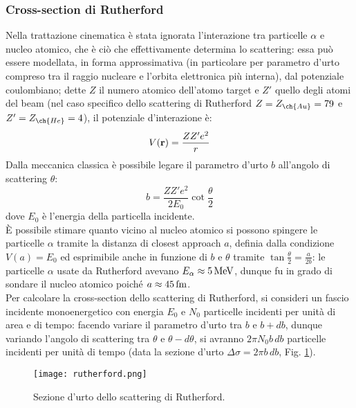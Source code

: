 \subsubsection{Cross-section di Rutherford}

Nella trattazione cinematica è stata ignorata l'interazione tra particelle $ \alpha $ e nucleo atomico, che è ciò che effettivamente determina lo scattering: essa può essere modellata, in forma approssimativa (in particolare per parametro d'urto compreso tra il raggio nucleare e l'orbita elettronica più interna), dal potenziale coulombiano; dette $ Z $ il numero atomico dell'atomo target e $ Z' $ quello degli atomi del beam (nel caso specifico dello scattering di Rutherford $ Z = Z_{\ch{Au}} = 79 $ e $ Z' = Z_{\ch{He}} = 4 $), il potenziale d'interazione è:
\begin{equation}
	V(\mathbf{r}) = \frac{ZZ' e^2}{r}
	\label{eq:4}
\end{equation}
Dalla meccanica classica è possibile legare il parametro d'urto $ b $ all'angolo di scattering $ \theta $:
\begin{equation}
	b = \frac{ZZ' e^2}{2 E_0} \cot \frac{\theta}{2}
	\label{eq:5}
\end{equation}
dove $ E_0 $ è l'energia della particella incidente.\\
È possibile stimare quanto vicino al nucleo atomico si possono spingere le particelle $ \alpha $ tramite la distanza di closest approach $ a $, definia dalla condizione $ V(a) = E_0 $ ed esprimibile anche in funzione di $ b $ e $ \theta $ tramite $ \tan \frac{\theta}{2} = \frac{a}{2b} $: le particelle $ \alpha $ usate da Rutherford avevano $ E_{\alpha} \approx 5\,\text{MeV} $, dunque fu in grado di sondare il nucleo atomico poiché $ a \approx 45\,\text{fm} $.\\
Per calcolare la cross-section dello scattering di Rutherford, si consideri un fascio incidente monoenergetico con energia $ E_0 $ e $ N_0 $ particelle incidenti per unità di area e di tempo: facendo variare il parametro d'urto tra $ b $ e $ b + db $, dunque variando l'angolo di scattering tra $ \theta $ e $ \theta - d \theta $, si avranno $ 2\pi N_0 b \,db $ particelle incidenti per unità di tempo (data la sezione d'urto $ \Delta\sigma = 2\pi b \,db $, Fig. \ref{rutherford}).
\begin{figure}
	\centering
	\texttt{[image: rutherford.png]}
	\caption{Sezione d'urto dello scattering di Rutherford.}
	\label{rutherford}
\end{figure}

